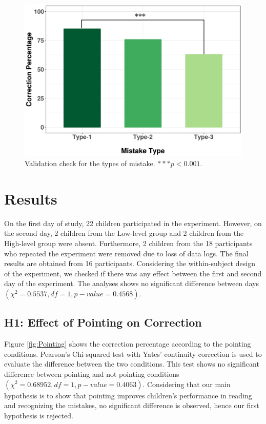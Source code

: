 \documentclass{sigchi}
\begin{document}
\begin{figure}[t]
  \centering
  \includegraphics[width=1\linewidth]{figures/cVt.pdf}
  \caption{Validation check for the types of mistake. $***p<0.001$.}
  \label{fig:MistakeCor}
\end{figure}



\section{Results}

On the first day of study, 22 children participated in the experiment.
However, on the second day, 2 children from the Low-level group and 2 children from the High-level group were absent.
Furthermore, 2 children from the 18 participants who repeated the experiment were removed due to loss of data logs.
The final results are obtained from 16 participants.
Considering the within-subject design of the experiment, we checked if there was any effect between the first and second day of the experiment.
The analyses shows no significant difference between days $(\chi^2 = 0.5537, df = 1, p-value = 0.4568)$.

\subsection{H1: Effect of Pointing on Correction}
Figure \ref{fig:Pointing} shows the correction percentage according to the pointing conditions.
Pearson's Chi-squared test with Yates' continuity correction is used to evaluate the difference between the two conditions.
This test shows no significant difference between pointing and not pointing conditions $(\chi^2 = 0.68952, df = 1, p-value = 0.4063)$.
Considering that our main hypothesis is to show that pointing improves children's performance in reading and recognizing the mistakes, no significant difference is observed, hence our first hypothesis is rejected. 
\end{document}
